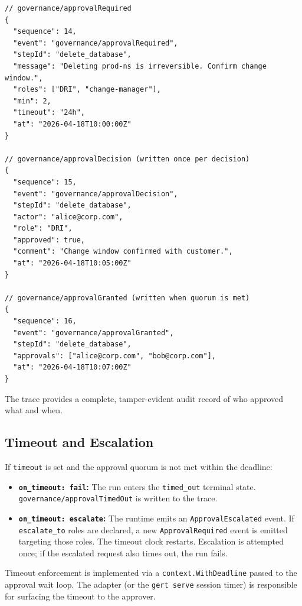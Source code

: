 \begin{verbatim}
// governance/approvalRequired
{
  "sequence": 14,
  "event": "governance/approvalRequired",
  "stepId": "delete_database",
  "message": "Deleting prod-ns is irreversible. Confirm change window.",
  "roles": ["DRI", "change-manager"],
  "min": 2,
  "timeout": "24h",
  "at": "2026-04-18T10:00:00Z"
}

// governance/approvalDecision (written once per decision)
{
  "sequence": 15,
  "event": "governance/approvalDecision",
  "stepId": "delete_database",
  "actor": "alice@corp.com",
  "role": "DRI",
  "approved": true,
  "comment": "Change window confirmed with customer.",
  "at": "2026-04-18T10:05:00Z"
}

// governance/approvalGranted (written when quorum is met)
{
  "sequence": 16,
  "event": "governance/approvalGranted",
  "stepId": "delete_database",
  "approvals": ["alice@corp.com", "bob@corp.com"],
  "at": "2026-04-18T10:07:00Z"
}
\end{verbatim}

The trace provides a complete, tamper-evident audit record of who approved what and when.

\subsection{Timeout and Escalation}

If \texttt{timeout} is set and the approval quorum is not met within the deadline:
\begin{itemize}
  \item \textbf{\texttt{on\_timeout: fail}:} The run enters the \texttt{timed\_out} terminal state.
        \texttt{governance/approvalTimedOut} is written to the trace.
  \item \textbf{\texttt{on\_timeout: escalate}:} The runtime emits an \texttt{ApprovalEscalated}
        event. If \texttt{escalate\_to} roles are declared, a new \texttt{ApprovalRequired} event
        is emitted targeting those roles. The timeout clock restarts. Escalation is attempted
        once; if the escalated request also times out, the run fails.
\end{itemize}

Timeout enforcement is implemented via a \texttt{context.WithDeadline} passed to the approval
wait loop. The adapter (or the \texttt{gert serve} session timer) is responsible for surfacing
the timeout to the approver.

